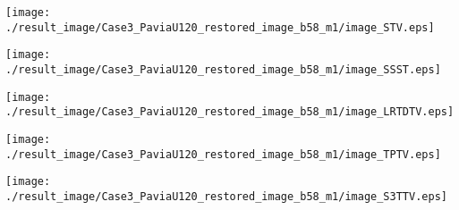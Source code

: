 \begin{figure*}[t]
\begin{center}
        \begin{minipage}{0.150\hsize}
            \centerline{\hspace{\hsize}} %
		\end{minipage}
        \begin{minipage}{0.150\hsize}
            \centerline{\texttt{[image: ./result\_image/Case3\_PaviaU120\_restored\_image\_b58\_m1/image\_STV.eps]}} %
        \end{minipage}
        \begin{minipage}{0.150\hsize}
            \centerline{\texttt{[image: ./result\_image/Case3\_PaviaU120\_restored\_image\_b58\_m1/image\_SSST.eps]}} %
        \end{minipage}
        \begin{minipage}{0.150\hsize}
            \centerline{\texttt{[image: ./result\_image/Case3\_PaviaU120\_restored\_image\_b58\_m1/image\_LRTDTV.eps]}} %
        \end{minipage}
        \begin{minipage}{0.150\hsize}
            \centerline{\texttt{[image: ./result\_image/Case3\_PaviaU120\_restored\_image\_b58\_m1/image\_TPTV.eps]}} %
        \end{minipage}
        \begin{minipage}{0.150\hsize}
            \centerline{\texttt{[image: ./result\_image/Case3\_PaviaU120\_restored\_image\_b58\_m1/image\_S3TTV.eps]}} %
        \end{minipage}
        \begin{minipage}{0.055\hsize}
            \centerline{\hspace{\hsize}} %
		\end{minipage}
        
        \vspace{1mm}


\end{center}
\end{figure*}
